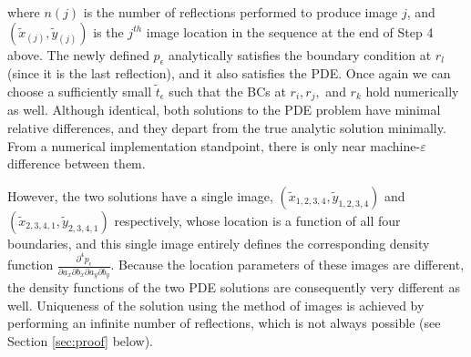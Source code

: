 where $n(j)$ is the number of reflections performed to produce image
$j$, and $(\tilde{x}_{(j)},\tilde{y}_{(j)})$ is the $j^{th}$ image
location in the sequence at the end of Step 4 above. The newly defined
$p_\epsilon$ analytically satisfies the boundary condition at $r_l$
(since it is the last reflection), and it also satisfies the PDE. Once
again we can choose a sufficiently small $\tilde{t}_\epsilon$ such
that the BCs at $r_i, r_j,$ and $r_k$ hold numerically as
well. Although identical, both solutions to the PDE problem have
minimal relative differences, and they depart from the true
analytic solution minimally. From a numerical implementation
standpoint, there is only near machine-$\varepsilon$ difference
between them.


However, the two solutions have a single image,
$(\tilde{x}_{1,2,3,4}, \tilde{y}_{1,2,3,4})$ and
$(\tilde{x}_{2,3,4,1}, \tilde{y}_{2,3,4,1})$ respectively, whose
location is a function of all four boundaries, and this single image
entirely defines the corresponding density function
$\frac{\partial^4 p_\epsilon}{\partial a_x \partial b_x \partial a_y
  \partial b_y}$. Because the location parameters of these images are
different, the density functions of the two PDE solutions are
consequently very different as well. Uniqueness of the solution using the
method of images is achieved by performing an infinite number of
reflections, which is not always possible (see Section \ref{sec:proof}
below).

